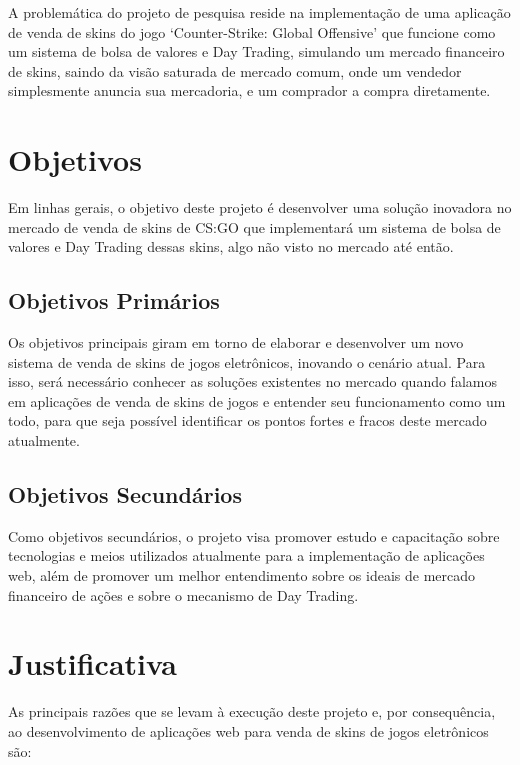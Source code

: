A problemática do projeto de pesquisa reside na implementação de uma aplicação de venda de skins do jogo ‘Counter-Strike: Global Offensive’ que funcione como um sistema de bolsa de valores e Day Trading, simulando um mercado financeiro de skins, saindo da visão saturada de mercado comum, onde um vendedor simplesmente anuncia sua mercadoria, e um comprador a compra diretamente.

\section{Objetivos}
Em linhas gerais, o objetivo deste projeto é desenvolver uma solução inovadora no mercado de venda de skins de CS:GO que implementará um sistema de bolsa de valores e Day Trading dessas skins, algo não visto no mercado até então.

\subsection{Objetivos Primários}
Os objetivos principais giram em torno de elaborar e desenvolver um novo sistema de venda de skins de jogos eletrônicos, inovando o cenário atual. Para isso, será necessário conhecer as soluções existentes no mercado quando falamos em aplicações de venda de skins de jogos e entender seu funcionamento como um todo, para que seja possível identificar os pontos fortes e fracos deste mercado atualmente.

\subsection{Objetivos Secundários}
Como objetivos secundários, o projeto visa promover estudo e capacitação sobre tecnologias e meios utilizados atualmente para a implementação de aplicações web, além de promover um melhor entendimento sobre os ideais de mercado financeiro de ações e sobre o mecanismo de Day Trading.

\section{Justificativa}
As principais razões que se levam à execução deste projeto e, por consequência, ao desenvolvimento de aplicações web para venda de skins de jogos eletrônicos são: 


